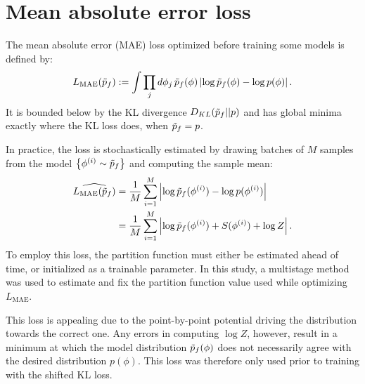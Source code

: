 \section{Mean absolute error loss}
\label{app:mae-loss}
The mean absolute error (MAE) loss optimized before training some models is defined by:
%
\begin{equation}
L_\text{MAE}(\tilde{p}_f) := \int \prod_j d\phi_j \, \tilde{p}_f(\phi) \left| \log{\tilde{p}_f(\phi)} - \log{p(\phi)} \right|.
\end{equation}
%
It is bounded below by the KL divergence $D_{KL}(\tilde{p}_f || p)$ and has global minima exactly where the KL loss does, when $\tilde{p}_f = p$.

In practice, the loss is stochastically estimated by drawing batches of $M$ samples from the model $\left\{ \phi^{(i)} \sim \tilde{p}_f \right\}$ and computing the sample mean:
%
\begin{equation}
\begin{aligned}
\widehat{L_\text{MAE}(\tilde{p}_f)} &= \frac{1}{M} \sum_{i=1}^M \left| \log{\tilde{p}_f(\phi^{(i)})} - \log{p(\phi^{(i)})} \right| \\
&= \frac{1}{M} \sum_{i=1}^M \left| \log{\tilde{p}_f(\phi^{(i)})} + S(\phi^{(i)}) + \log{Z} \right|.
\end{aligned}
\end{equation}
To employ this loss, the partition function must either be estimated ahead of time, or initialized as a trainable parameter. In this study, a multistage method~\cite{ValleauFreeEnergy72} was used to estimate and fix the partition function value used while optimizing $L_\text{MAE}$.

\setlength{\parskip}{2pt}
This loss is appealing due to the point-by-point potential driving the distribution towards the correct one. Any errors in computing $\log{Z}$, however, result in a minimum at which the model distribution $\tilde{p}_f(\phi)$ does not necessarily agree with the desired distribution $p(\phi)$. This loss was therefore only used prior to training with the shifted KL loss.


